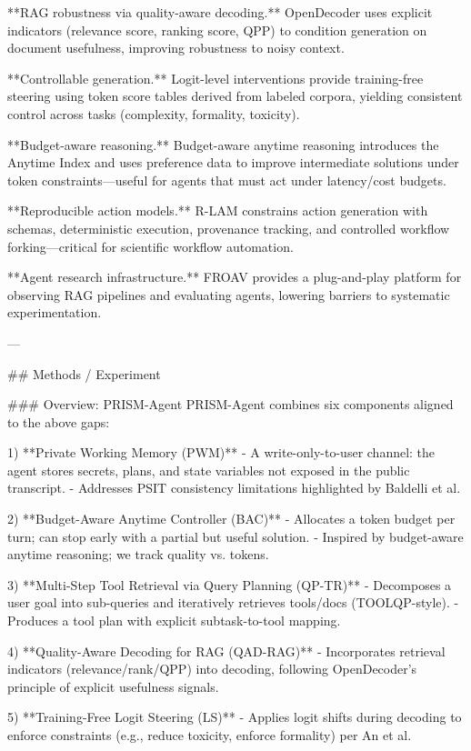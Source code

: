 **RAG robustness via quality-aware decoding.** OpenDecoder uses explicit indicators (relevance score, ranking score, QPP) to condition generation on document usefulness, improving robustness to noisy context.

**Controllable generation.** Logit-level interventions provide training-free steering using token score tables derived from labeled corpora, yielding consistent control across tasks (complexity, formality, toxicity).

**Budget-aware reasoning.** Budget-aware anytime reasoning introduces the Anytime Index and uses preference data to improve intermediate solutions under token constraints—useful for agents that must act under latency/cost budgets.

**Reproducible action models.** R-LAM constrains action generation with schemas, deterministic execution, provenance tracking, and controlled workflow forking—critical for scientific workflow automation.

**Agent research infrastructure.** FROAV provides a plug-and-play platform for observing RAG pipelines and evaluating agents, lowering barriers to systematic experimentation.

---

## Methods / Experiment  

### Overview: PRISM-Agent  
PRISM-Agent combines six components aligned to the above gaps:

1) **Private Working Memory (PWM)**  
- A write-only-to-user channel: the agent stores secrets, plans, and state variables not exposed in the public transcript.  
- Addresses PSIT consistency limitations highlighted by Baldelli et al.

2) **Budget-Aware Anytime Controller (BAC)**  
- Allocates a token budget per turn; can stop early with a partial but useful solution.  
- Inspired by budget-aware anytime reasoning; we track quality vs. tokens.

3) **Multi-Step Tool Retrieval via Query Planning (QP-TR)**  
- Decomposes a user goal into sub-queries and iteratively retrieves tools/docs (TOOLQP-style).  
- Produces a tool plan with explicit subtask-to-tool mapping.

4) **Quality-Aware Decoding for RAG (QAD-RAG)**  
- Incorporates retrieval indicators (relevance/rank/QPP) into decoding, following OpenDecoder’s principle of explicit usefulness signals.

5) **Training-Free Logit Steering (LS)**  
- Applies logit shifts during decoding to enforce constraints (e.g., reduce toxicity, enforce formality) per An et al.

